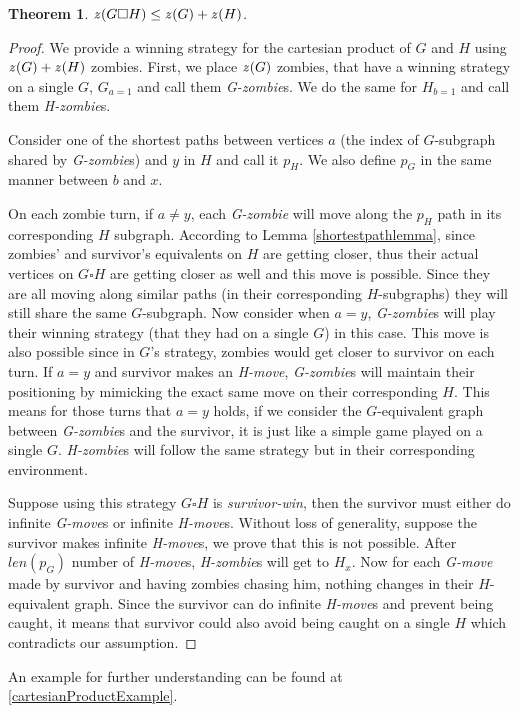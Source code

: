 \documentclass[1p]{elsarticle}
\newtheorem{theorem}{Theorem}
\newcommand{\zn}{\ooalign{$z$\cr\hfil\rule[.5ex]{.2em}{.08ex}\hfil\cr}}
\begin{document}
\begin{theorem}
	\label{T2}
	$\zn(G \square H) \leq \zn(G) + \zn(H)$.
\end{theorem}

\begin{proof}
	We provide a winning strategy for the cartesian product of $G$ and $H$ using $\zn(G)+\zn(H)$ zombies. First, we place
	$\zn(G)$ zombies, that have a winning strategy on a single $G$, $G_{a = 1}$ and call them {\it G-zombie}s. We do the
	same for $H_{b = 1}$ and call them {\it H-zombie}s.


	Consider one of the shortest paths between vertices $a$ (the index of $G$-subgraph shared by {\it G-zombie}s) and
	$y$ in $H$ and call it $p_H$. We also define $p_G$ in the same manner between $b$ and $x$.


	On each zombie turn, if $a \neq y$, each {\it G-zombie} will move along the $p_H$ path in its corresponding $H$
	subgraph. According to Lemma \ref{shortestpathlemma}, since zombies' and survivor's equivalents on $H$ are getting
	closer, thus their actual vertices on $G \square H$ are getting closer as well and this move is possible. Since they
	are all moving along similar paths (in their corresponding $H$-subgraphs) they will still share the same
	$G$-subgraph. Now consider when $a = y$, {\it G-zombie}s will play their winning strategy (that they had on a single
	$G$) in this case. This move is also possible since in $G$'s strategy, zombies would get closer to survivor on each
	turn. If $a = y$ and survivor makes an {\it H-move}, {\it G-zombie}s will maintain their positioning by mimicking
	the exact same move on their corresponding $H$. This means for those turns that $a=y$ holds, if we consider the
	$G$-equivalent graph between {\it G-zombie}s and the survivor, it is just like a simple game played on a single $G$.
	{\it H-zombie}s will follow the same strategy but in their corresponding environment.
	
	
	Suppose using this strategy $G \square H$ is {\it survivor-win}, then the survivor must either do infinite {\it
	G-move}s or infinite {\it H-move}s. Without loss of generality, suppose the survivor makes infinite {\it H-move}s,
	we prove that this is not possible. After $len(p_G)$ number of {\it H-move}s, {\it H-zombie}s will get to $H_x$. Now for
	each {\it G-move} made by survivor and having zombies chasing him, nothing changes in their $H$-equivalent graph.
	Since the survivor can do infinite {\it H-move}s and prevent being caught, it means that survivor could also avoid
	being caught on a single $H$ which contradicts our assumption.
	
\end{proof}
An example for further understanding can be found at \ref{cartesianProductExample}.
\end{document}
